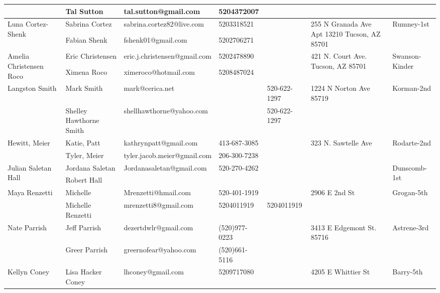 \documentclass[landscape]{book}\usepackage[]{graphicx}\usepackage[]{color}
\begin{document}
\begin{longtable}{p{70pt}|p{75pt}|p{120pt}|p{60pt}|p{60pt}|p{100pt}|p{70pt}|}
 & Tal Sutton & tal.sutton@gmail.com & 5204372007 &  & & \\
\hline
\multirow{2}{70pt}{Luna Cortez-Shenk} & Sabrina Cortez & sabrina.cortez82@live.com & 5203318521 &  & \multirow{2}{100pt}{255 N Granada Ave Apt 13210 Tucson, AZ 85701} & \multirow{2}{70pt}{Rumney-1st}\\
 & Fabian Shenk & fshenk01@gmail.com & 5202706271 &  & & \\
\hline
\multirow{2}{70pt}{Amelia Christensen Roco} & Eric Christensen & eric.j.christensen@gmail.com & 5202478890 &  & \multirow{2}{100pt}{421 N. Court Ave. Tucson, AZ 85701} & \multirow{2}{70pt}{Swanson-Kinder}\\
 & Ximena Roco & ximeroco@hotmail.com & 5208487024 &  & & \\
\hline
\multirow{2}{70pt}{Langston Smith} & Mark Smith & mark@cerica.net &  & 520-622-1297 & \multirow{2}{100pt}{1224 N Norton Ave 85719} & \multirow{2}{70pt}{Korman-2nd}\\
 & Shelley Hawthorne Smith & shellhawthorne@yahoo.com &  & 520-622-1297 & & \\
\hline
\multirow{2}{70pt}{Hewitt, Meier} & Katie, Patt & kathrynpatt@gmail.com & 413-687-3085 &  & \multirow{2}{100pt}{323 N. Sawtelle Ave} & \multirow{2}{70pt}{Rodarte-2nd}\\
 & Tyler, Meier & tyler.jacob.meier@gmail.com & 206-300-7238 &  & & \\
\hline
\multirow{2}{70pt}{Julian Saletan Hall} & Jordana Saletan & Jordanasaletan@gmail.com & 520-270-4262 &  & \multirow{2}{100pt}{} & \multirow{2}{70pt}{Dunscomb-1st}\\
 & Robert Hall &  &  &  & & \\
\hline
\multirow{2}{70pt}{Maya Renzetti } & Michelle  & Mrenzetti@hmail.com & 520-401-1919 &  & \multirow{2}{100pt}{2906 E 2nd St} & \multirow{2}{70pt}{Grogan-5th}\\
 & Michelle Renzetti & mrenzetti8@gmail.com & 5204011919 & 5204011919 & & \\
\hline
\multirow{2}{70pt}{Nate Parrish} & Jeff Parrish & dezertdwlr@gmail.com & (520)977-0223 &  & \multirow{2}{100pt}{3413 E Edgemont St. 85716} & \multirow{2}{70pt}{Astrene-3rd}\\
 & Greer Parrish & greernofear@yahoo.com & (520)661-5116 &  & & \\
\hline
\multirow{2}{70pt}{Kellyn Coney} & Lisa Hacker Coney & lhconey@gmail.com & 5209717080 &  & \multirow{2}{100pt}{4205 E Whittier St} & \multirow{2}{70pt}{Barry-5th}\\

\end{longtable}
\end{document}
